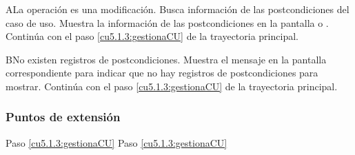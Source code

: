  \begin{UCtrayectoriaA}{A}{La operación es una modificación.}
    \UCpaso[\UCsist] Busca información de las postcondiciones del caso de uso. 
    \UCpaso[\UCsist] Muestra la información de las postcondiciones en la pantalla  o . 
    \UCpaso[] Continúa con el paso \ref{cu5.1.3:gestionaCU} de la trayectoria principal.
 \end{UCtrayectoriaA}
 
 \begin{UCtrayectoriaA}{B}{No existen registros de postcondiciones.}
    \UCpaso[\UCsist] Muestra el mensaje  en la pantalla correspondiente
    para indicar que no hay registros de postcondiciones para mostrar.
    \UCpaso[] Continúa con el paso \ref{cu5.1.3:gestionaCU} de la trayectoria principal.
 \end{UCtrayectoriaA}

 

\subsubsection{Puntos de extensión}

	{Paso \ref{cu5.1.3:gestionaCU}}
	{}
	{Paso \ref{cu5.1.3:gestionaCU}}
	{}
  